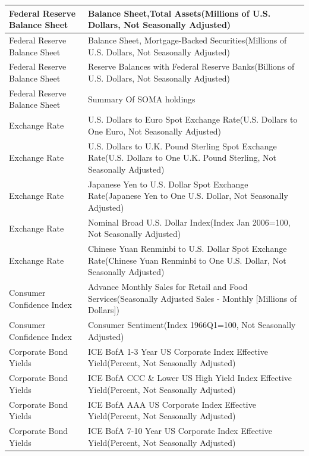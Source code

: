 \begin{center}
\begin{singlespace}
\begin{scriptsize}
\begin{longtable}{p{}|p{}}
        \hline
        Federal Reserve Balance Sheet  & Balance Sheet,Total Assets(Millions of U.S. Dollars, Not Seasonally Adjusted) \\
        \hline
        Federal Reserve Balance Sheet  & Balance Sheet, Mortgage-Backed Securities(Millions of U.S. Dollars, Not Seasonally Adjusted) \\
        \hline
        Federal Reserve Balance Sheet  & Reserve Balances with Federal Reserve Banks(Billions of U.S. Dollars, Not Seasonally Adjusted) \\
        \hline
        Federal Reserve Balance Sheet  & Summary Of SOMA holdings \\
        \hline
        Exchange Rate  & U.S. Dollars to Euro Spot Exchange Rate(U.S. Dollars to One Euro, Not Seasonally Adjusted) \\
        \hline
        Exchange Rate  & U.S. Dollars to U.K. Pound Sterling Spot Exchange Rate(U.S. Dollars to One U.K. Pound Sterling, Not Seasonally Adjusted) \\
        \hline
        Exchange Rate  & Japanese Yen to U.S. Dollar Spot Exchange Rate(Japanese Yen to One U.S. Dollar, Not Seasonally Adjusted) \\
        \hline
        Exchange Rate  & Nominal Broad U.S. Dollar Index(Index Jan 2006=100, Not Seasonally Adjusted) \\
        \hline
        Exchange Rate  & Chinese Yuan Renminbi to U.S. Dollar Spot Exchange Rate(Chinese Yuan Renminbi to One U.S. Dollar, Not Seasonally Adjusted) \\
        \hline
        Consumer Confidence Index  & Advance Monthly Sales for Retail and Food Services(Seasonally Adjusted Sales - Monthly [Millions of Dollars]) \\
        \hline
        Consumer Confidence Index  & Consumer Sentiment(Index 1966Q1=100, Not Seasonally Adjusted) \\
        \hline
        Corporate Bond Yields  & ICE BofA 1-3 Year US Corporate Index Effective Yield(Percent, Not Seasonally Adjusted) \\
        \hline
        Corporate Bond Yields  & ICE BofA CCC \& Lower US High Yield Index Effective Yield(Percent, Not Seasonally Adjusted) \\
        \hline
        Corporate Bond Yields  & ICE BofA AAA US Corporate Index Effective Yield(Percent, Not Seasonally Adjusted) \\
        \hline
        Corporate Bond Yields  & ICE BofA 7-10 Year US Corporate Index Effective Yield(Percent, Not Seasonally Adjusted) \\

\end{longtable}
\end{scriptsize}
\end{singlespace}
\end{center}
